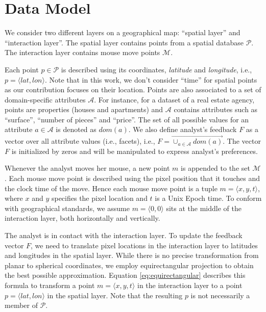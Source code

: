 \documentclass[sigconf,edbt]{acmart-edbt2019}
\begin{document}
\section{Data Model}
\label{sec:datamodel}
We consider two different layers on a geographical map: ``spatial layer'' and ``interaction layer''. The spatial layer contains points from a spatial database $\mathcal{P}$. The interaction layer contains mouse move points $\mathcal{M}$.

\vspace{2pt}
 Each point $p \in \mathcal{P}$ is described using its coordinates, {\em latitude} and {\em longitude}, i.e., $p = \langle \mathit{lat}, \mathit{lon} \rangle$. Note that in this work, we don't consider ``time'' for spatial points as our contribution focuses on their location. Points are also associated to a set of domain-specific attributes $\mathcal{A}$. For instance, for a dataset of a real estate agency, points are properties (houses and apartments) and $\mathcal{A}$ contains attributes such as ``surface'', ``number of pieces'' and  ``price''. The set of all possible values for an attribute $a \in \mathcal{A}$ is denoted as $dom(a)$. We also define analyst's feedback $F$ as a vector over all attribute values (i.e., facets), i.e., $F = \overrightarrow{\cup_{a \in \mathcal{A}}dom(a)}$. The vector $F$ is initialized by zeros and will be manipulated to express analyst's preferences.

\vspace{2pt}
 Whenever the analyst moves her mouse, a new point $m$ is appended to the set $\mathcal{M}$. Each mouse move point is described using the pixel position that it touches and the clock time of the move. Hence each mouse move point is a tuple $m = \langle x, y, t \rangle$, where $x$ and $y$ specifies the pixel location and $t$ is a Unix Epoch time. To conform with geographical standards, we assume $m = \langle 0, 0\rangle$ sits at the middle of the interaction layer, both horizontally and vertically.

\vspace{2pt}
The analyst is in contact with the interaction layer. To update the feedback vector $F$, we need to translate pixel locations in the interaction layer to latitudes and longitudes in the spatial layer. While there is no precise transformation from planar to spherical coordinates, we employ equirectangular projection to obtain the best possible approximation. Equation \ref{eq:equirectangular} describes this formula to transform a point $m = \langle x,y,t \rangle$ in the interaction layer to a point $p = \langle lat, lon \rangle$ in the spatial layer. Note that the resulting $p$ is not necessarily a member of $\mathcal{P}$. 
\end{document}
